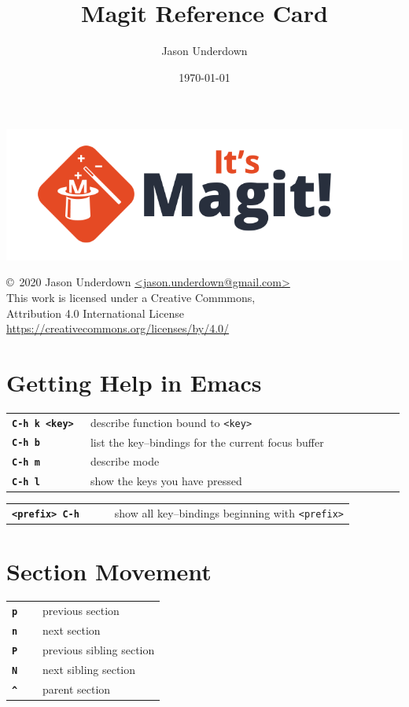 \documentclass[9pt]{extarticle} %
\begin{document}
\begin{multicols}{3}

  \title{Magit Reference Card}
  \author{Jason Underdown}
  \date{\today}

  \includegraphics[scale=0.25]{magit.png}

  {\small
    \copyright\ 2020 Jason Underdown \url{<jason.underdown@gmail.com>}\\
    This work is licensed under a Creative Commmons, \\
    Attribution 4.0 International License \\
    \url{https://creativecommons.org/licenses/by/4.0/}
  }

  \vspace{5ex}

  \section*{Getting Help in Emacs}

  \begin{tabular}{L{0.20\linewidth} L{0.80\linewidth}}
    \tt \textbf{C-h k <key>}
    & describe function bound to \texttt{<key>}  \\
    \tt \textbf{C-h b}
    & list the key--bindings for the current focus buffer \\
    \tt \textbf{C-h m}
    & describe mode \\
    \tt \textbf{C-h l}
    & show the keys you have pressed
  \end{tabular}
  \begin{tabular}{L{0.30\linewidth} L{0.70\linewidth}}
    \tt \textbf{<prefix> C-h}
    & show all key--bindings beginning with \texttt{<prefix>}
  \end{tabular}

  \vspace{5ex}

  \section*{Section Movement}
  \begin{tabular}{L{0.20\linewidth} L{0.80\linewidth}}
    \tt \textbf{p}  & previous section \\
    \tt \textbf{n}  & next section \\
    \tt \textbf{P}  & previous sibling section \\
    \tt \textbf{N}  & next sibling section \\
    \tt \textbf{\^} & parent section
  \end{tabular}


\end{multicols}
\end{document}
